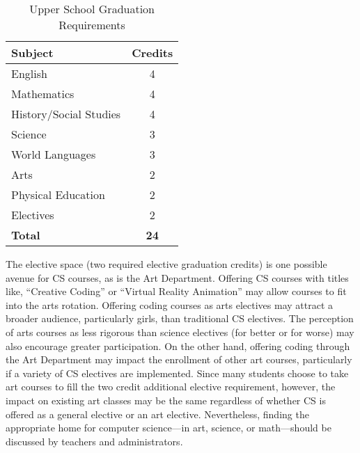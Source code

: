 \begin{table}
	\begin{center}
\begin{tabular}{ | l | c | }
	
	\hline
	\textbf{Subject} & \textbf{Credits} \\ \hline
	English & 4 \\ \hline
	Mathematics & 4 \\ \hline
	History/Social Studies & 4 \\ \hline
	Science & 3 \\ \hline
	World Languages & 3 \\ \hline
	Arts & 2 \\ \hline
	Physical Education & 2 \\ \hline
	Electives & 2 \\ \hline
	\textbf{Total} & \textbf{24} \\ \hline
\end{tabular} 
\caption{Upper School Graduation Requirements} \label{tab:usreqs} 
\end{center}
\end{table}
\par
The elective space (two required elective graduation credits) is one possible avenue for CS courses, as is the Art Department. Offering CS courses with titles like, ``Creative Coding'' or ``Virtual Reality Animation'' may allow courses to fit into the arts rotation. Offering coding courses as arts electives may attract a broader audience, particularly girls, than traditional CS electives. The perception of arts courses as less rigorous than science electives (for better or for worse) may also encourage greater participation. On the other hand, offering coding through the Art Department may impact the enrollment of other art courses, particularly if a variety of CS electives are implemented. Since many students choose to take art courses to fill the two credit additional elective requirement, however, the impact on existing art classes may be the same regardless of whether CS is offered as a general elective or an art elective. Nevertheless, finding the appropriate home for computer science---in art, science, or math---should be discussed by teachers and administrators.   \par


